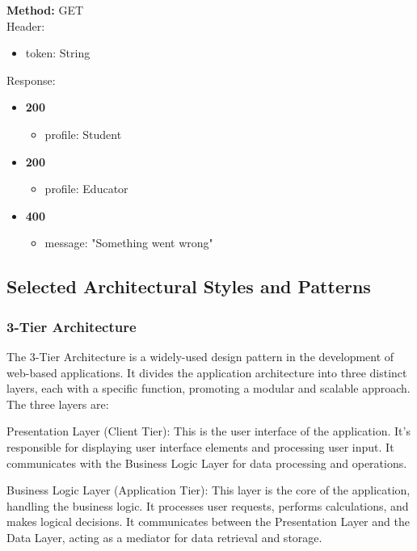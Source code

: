 \begin{enumerate}
    \textbf{Method:} GET \\
    Header:\\
    \begin{itemize}
        \item token: String
    \end{itemize}
    Response:\\
    \begin{itemize}
        \item \textbf{200} \\
        \begin{itemize}
            \item profile: Student
        \end{itemize}
        \item \textbf{200} \\
        \begin{itemize}
            \item profile: Educator
        \end{itemize}
        \item \textbf{400} \\
        \begin{itemize}
            \item message: "Something went wrong"
        \end{itemize}
    \end{itemize}
\end{enumerate}
\newpage
\subsection{Selected Architectural Styles and Patterns}
\subsubsection{3-Tier Architecture}
The 3-Tier Architecture is a widely-used design pattern in the development of web-based applications. It divides the application architecture into three distinct layers, each with a specific function, promoting a modular and scalable approach. The three layers are:

Presentation Layer (Client Tier): This is the user interface of the application. It's responsible for displaying user interface elements and processing user input. It communicates with the Business Logic Layer for data processing and operations.

Business Logic Layer (Application Tier): This layer is the core of the application, handling the business logic. It processes user requests, performs calculations, and makes logical decisions. It communicates between the Presentation Layer and the Data Layer, acting as a mediator for data retrieval and storage.

